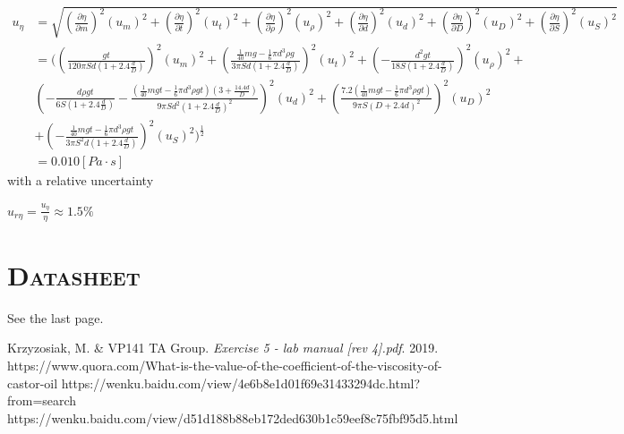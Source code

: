 \documentclass[a4paper,12pt]{article}
\begin{document}
\begin{appendices}
      \begin{align*}
      \displaystyle u_{\eta} &= \sqrt{(\frac{\partial \eta}{\partial m})^2(u_m)^2 + (\frac{\partial \eta}{\partial t})^2({u_t})^2 + (\frac{\partial \eta}{\partial \rho})^2(u_\rho)^2 + (\frac{\partial \eta}{\partial d})^2(u_d)^2 + (\frac{\partial \eta}{\partial D})^2(u_D)^2 + (\frac{\partial \eta}{\partial S})^2(u_S)^2}\\
&=((\frac{gt}{120\pi Sd(1+2.4\frac{d}{D})})^2(u_m)^2 + (\frac{\frac{1}{40}mg-\frac{1}{6}\pi d^3\rho g}{3\pi Sd(1+2.4\frac{d}{D})})^2(u_t)^2 + (-\frac{d^2gt}{18S(1+2.4\frac{d}{D})})^2(u_\rho)^2 + 
\\
& (-\frac{d \rho g t}{6S(1+2.4\frac{d}{D})} -  \frac{(\frac{1}{40}mgt-\frac{1}{6}\pi d^3\rho gt)(3 + \frac{14.4d}{D})}{9\pi Sd^2(1+2.4\frac{d}{D})^2})^2(u_d)^2 + (\frac{7.2(\frac{1}{40}mgt-\frac{1}{6}\pi d^3 \rho g t)}{9\pi S (D+2.4d)^2})^2(u_D)^2 
\\
& + (- \frac{\frac{1}{40}mgt-\frac{1}{6}\pi d^3\rho gt}{3\pi S^2d(1+2.4\frac{d}{D})})^2(u_S)^2)^{\frac{1}{2}}
\\
& =0.010 [Pa\cdot s]
      \end{align*}
      with a relative uncertainty 
      \begin{center}
      $\displaystyle u_{r\eta} = \frac{u_\eta}{\eta} \approx 1.5\%$
      \end{center}
      
      \section{\textsc{Datasheet}} 
      See the last page.
  \end{appendices} 


\begin{thebibliography}{9}
 Krzyzosiak, M. \& VP141 TA Group.
\textit{Exercise 5 - lab manual [rev 4].pdf}. 
2019.
 https://www.quora.com/What-is-the-value-of-the-coefficient-of-the-viscosity-of-castor-oil
 https://wenku.baidu.com/view/4e6b8e1d01f69e31433294dc.html?from=search
 https://wenku.baidu.com/view/d51d188b88eb172ded630b1c59eef8c75fbf95d5.html
\end{thebibliography}



\end{document}
